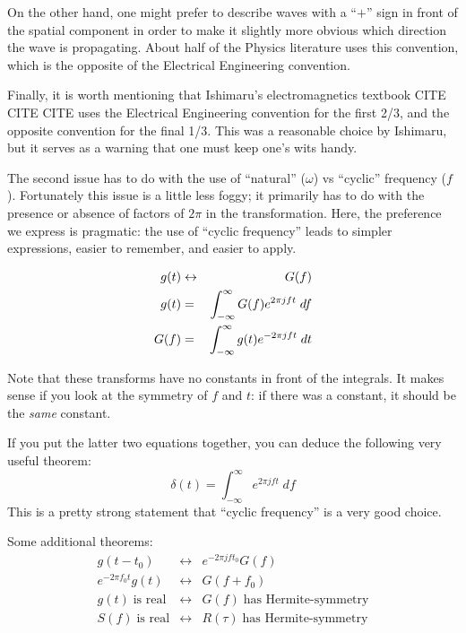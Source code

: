 On the other hand, one might prefer to describe waves with a ``$+$'' sign in front of the spatial 
component in order to make it slightly more obvious which direction the wave is propagating.  About
half of the Physics literature uses this convention, which is the opposite of the Electrical Engineering
convention.

Finally, it is worth mentioning that Ishimaru's electromagnetics textbook CITE CITE CITE uses 
the Electrical Engineering convention for the first 2/3, and the opposite convention for the final 1/3.
This was a reasonable choice by Ishimaru, but it serves as a warning that one must keep one's 
wits handy.

\vspace{1em}
The second issue has to do with the use of ``natural'' ($\omega$) vs ``cyclic'' frequency ($f$).  
Fortunately this issue is a little less foggy; it primarily has to do with the presence or absence of
factors of $2\pi$ in the transformation.  Here, the preference we express is pragmatic: the use of 
``cyclic frequency'' leads to simpler expressions, easier to remember, and easier to apply.

\label{fourier-transform}

\begin{eqnarray}
g(t)         &\leftrightarrow& G(f) \\
g(t)         &=& \int_{-\infty}^\infty G(f) e^{2\pi j f t} \; df \\
G(f)         &=& \int_{-\infty}^\infty g(t) e^{-2\pi j f t} \; dt 
\end{eqnarray}

Note that these transforms have no constants in front of the integrals.  It makes sense if you look 
at the symmetry of $f$ and $t$: if there was a constant, it should be the \textit{same} constant.

If you put the latter two equations together, you can deduce the following very useful theorem:
\begin{equation}
\delta(t) = \int_{-\infty}^\infty e^{2\pi j f t} \;df
\end{equation}
This is a pretty strong statement that ``cyclic frequency'' is a very good choice.

Some additional theorems:
\begin{eqnarray}
g(t - t_0)   &\leftrightarrow& e^{-2\pi j ft_0} G(f)  \\
e^{-2\pi f_0 t} g(t) &\leftrightarrow& G(f + f_0) \\
g(t) \;\textrm{is real} &\leftrightarrow& G(f) \;\textrm{has Hermite-symmetry} \\
S(f) \;\textrm{is real} &\leftrightarrow& R(\tau) \;\textrm{has Hermite-symmetry}
\end{eqnarray}

